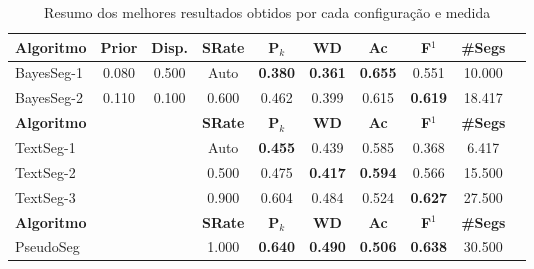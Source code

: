 \begin{table}[!h]
\begin{tabular}{|l||c|c|c|c|c|c|c|c|c|}
\hline
		\textbf{Algoritmo} &
		\textbf{Prior} &
		\textbf{Disp.} & 
		\textbf{SRate}& 
		\textbf{P$_k$} & 
		\textbf{WD} & 
		\textbf{Ac} & 
		\textbf{F$^1$} &
		\textbf{\#Segs} \\	\hline


 BayesSeg-1 & 0.080 & 0.500 &  Auto & \cellcolor{gray!20} \textbf{0.380} & \cellcolor{gray!20} \textbf{0.361} & \cellcolor{gray!20} \textbf{0.655} 
		  & 0.551 & 10.000  \\ \hline 
 BayesSeg-2 & 0.110 & 0.100 & 0.600 & 0.462 & 0.399 & 0.615 
		  & \cellcolor{gray!20} \textbf{0.619} & 18.417  \\ \hline 

\hline
		\textbf{Algoritmo} &&&
		\textbf{SRate} & 
		\textbf{P$_k$} & 
		\textbf{WD} & 
		\textbf{Ac} & 
		\textbf{F$^1$} &
		\textbf{\#Segs} \\	\hline

TextSeg-1 &&& Auto & \cellcolor{gray!20} \textbf{0.455} & 0.439 & 0.585 
		& 0.368 & 6.417  \\ \hline 
TextSeg-2 &&& 0.500 & 0.475 & \cellcolor{gray!20} \textbf{0.417} & \cellcolor{gray!20} \textbf{0.594} 
		& 0.566 & 15.500  \\ \hline 
TextSeg-3 &&& 0.900 & 0.604 & 0.484 & 0.524 
		& \cellcolor{gray!20} \textbf{0.627} & 27.500  \\ \hline 

\hline
		\textbf{Algoritmo} &&&
		\textbf{SRate} & 
		\textbf{P$_k$} & 
		\textbf{WD} & 
		\textbf{Ac} & 
		\textbf{F$^1$} &
		\textbf{\#Segs} \\	\hline


PseudoSeg &&& 1.000& \cellcolor{gray!20} \textbf{0.640} & \cellcolor{gray!20} \textbf{0.490} & \cellcolor{gray!20} \textbf{0.506} 
		   & \cellcolor{gray!20} \textbf{0.638} & 30.500  \\ \hline 



	\end{tabular}
	\caption{Resumo dos melhores resultados obtidos por cada configuração e medida}
	\label{tab:resumo-resultados}
\end{table}
